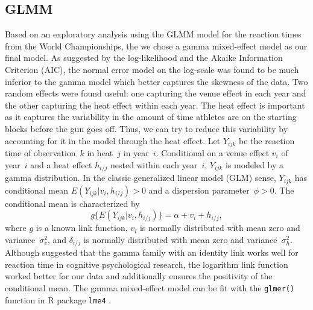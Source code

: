 \documentclass[12pt, letterpaper, titlepage]{article}
\newcommand{\eds}[1]{\textcolor{red}{EDS: (#1)}}
\newcommand{\of}[1]{\textcolor{violet}{OF: #1}}
\begin{document}
\subsection{GLMM}\label{sec:glmm}
Based on an exploratory analysis using the GLMM model for the reaction times
from the World Championships, the we chose a gamma mixed-effect model as our 
final model. As suggested by the log-likelihood and the Akaike Information
Criterion (AIC), the normal error model on the log-scale was found to be
much inferior to the gamma model which better captures the skewness of the
data. Two random effects were found useful: one capturing the venue effect in
each year and the other capturing the heat effect within each year.  The heat
effect is important as it captures the variability in the amount of time
athletes are on the starting blocks before the gun goes off.  Thus, we can try
to reduce this variability by accounting for it in the model through the heat
effect.
Let $Y_{ijk}$ be the reaction time of observation~$k$ in heat~$j$ in year~$i$.
Conditional on a venue effect $v_i$ of year~$i$ and a heat effect
$h_{i/j}$ nested within each year~$i$, $Y_{ijk}$ is modeled by a
gamma distribution. 
In the classic generalized linear model (GLM) sense,
$Y_{ijk}$ has conditional mean $E(Y_{ijk} | v_i, h_{i/j}) > 0$ and a
dispersion parameter~$\phi > 0$. The conditional mean is characterized by
\[
g\{E(Y_{ijk} | v_i, h_{i/j})\} = \alpha + v_i + h_{i/j},
\]
where $g$ is a known link function,
$v_i$ is normally distributed with mean zero and
variance~$\sigma_v^2$, and $\delta_{i/j}$ is normally distributed with mean
zero and variance~$\sigma_h^2$.
Although \citet{lo2015idlink} suggested that the gamma 
family with an identity link works well for reaction time in cognitive
psychological research, the logarithm
link function worked better for our data and additionally ensures the positivity
of the conditional mean. The gamma mixed-effect model can be fit with the 
\texttt{glmer()} function in R package \texttt{lme4} \citep{lme4}.
\end{document}
